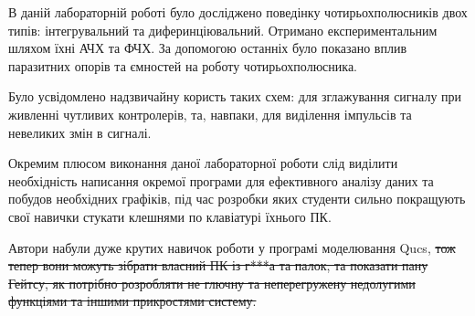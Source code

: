 
В даній лабораторній роботі було досліджено поведінку чотирьохполюсників двох типів: інтегрувальний та диферинціювальний. Отримано експериментальним шляхом їхні АЧХ та ФЧХ. За допомогою останніх було показано вплив паразитних опорів та ємностей на роботу чотирьохполюсника. 

Було усвідомлено надзвичайну користь таких схем: для зглажування сигналу при живленні чутливих контролерів, та, навпаки, для виділення імпульсів та невеликих змін в сигналі.

Окремим плюсом виконання даної лабораторної роботи слід виділити необхідність написання окремої програми для ефективного аналізу даних та побудов необхідних графіків, під час розробки яких студенти сильно покращують свої навички стукати клешнями по клавіатурі їхнього ПК.

Автори набули дуже крутих навичок роботи у програмі моделювання Qucs, \sout{тож тепер вони можуть зібрати власний ПК із г***а та палок, та показати пану Гейтсу, як потрібно розробляти не глючну та неперегружену недолугими функціями та іншими прикростями систему. }